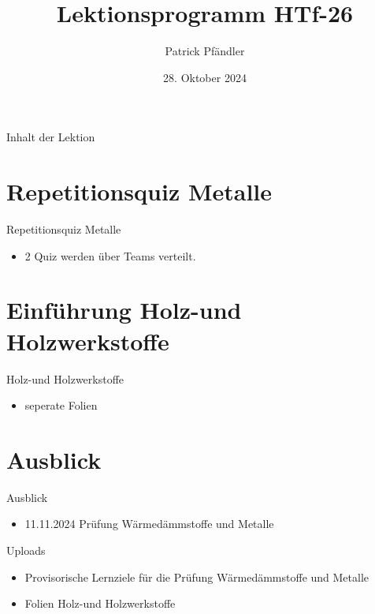 

\title{\textbf{Lektionsprogramm HTf-26}}
\author{Patrick Pfändler}
\date{28. Oktober 2024}




\frame{\titlepage}

\begin{frame}{Inhalt der Lektion}
    \tableofcontents
\end{frame}


\section{Repetitionsquiz Metalle}

\begin{frame}{Repetitionsquiz Metalle}
\begin{itemize}
	\item 2 Quiz werden über Teams verteilt.
\end{itemize}
\end{frame}

%
\section{Einführung Holz-und Holzwerkstoffe}
\begin{frame}{Holz-und Holzwerkstoffe}
\begin{itemize}
	\item seperate Folien
\end{itemize}	
\end{frame}
\section{Ausblick}

\begin{frame}{Ausblick}
	\begin{itemize}
		\item 11.11.2024 Prüfung Wärmedämmstoffe und Metalle
	\end{itemize}
\end{frame}

\begin{frame}{Uploads}
    \begin{itemize}
        \item Provisorische Lernziele für die Prüfung Wärmedämmstoffe und Metalle
        \item Folien Holz-und Holzwerkstoffe
    \end{itemize}
    
\end{frame}



